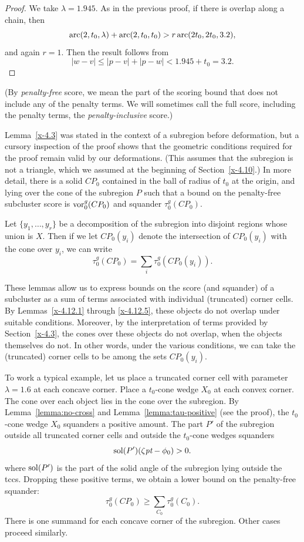 \begin{proof}
We take $\lambda=1.945$. As in the previous proof, if there is overlap
along a chain, then
    $$\operatorname{arc}(2,t_0,\lambda) +\operatorname{arc}(2,t_0,t_0) > r \operatorname{arc}(2t_0,2t_0,3.2),$$
and again $r=1$.  Then the result follows from
    $$|w-v|\le |p-v|+|p-w| < 1.945 + t_0 = 3.2.$$
\end{proof}

\begin{definition}
(By {\it penalty-free\/} score, we mean the part of the scoring
bound that does not include any of the penalty terms.  We will
sometimes call the full score, including the penalty terms, the
{\it penalty-inclusive\/} score.)
\end{definition}

Lemma~\ref{x-4.3} was stated in the context of a subregion before
deformation, but a cursory inspection of the proof shows that the
geometric conditions required for the proof remain valid by our
deformations. (This assumes that the subregion is not a triangle, which
we assumed at the beginning of Section~\ref{x-4.10}.) In more detail,
there is a solid $CP_0$ contained in the ball of radius of $t_0$ at the
origin, and lying over the cone of the subregion $P$ such that a bound
on the penalty-free subcluster score is $\operatorname{vor}^g_0(CP_0)$ and squander
$\tau^g_0(CP_0)$.


Let $\{y_1,\ldots,y_r\}$ be a decomposition of the subregion into
disjoint regions whose union is $X$. Then if we let $CP_0(y_i)$ denote
the intersection of $CP_0(y_i)$ with the cone over $y_i$, we can write
    $$\tau^g_0(CP_0) =\sum_i \tau^g_0(CP_0(y_i)).$$

These lemmas allow us to express bounds on the score (and squander) of a
subcluster as a sum of terms associated with individual (truncated)
corner cells. By Lemmas~\ref{x-4.12.1} through \ref{x-4.12.5}, these
objects do not overlap under suitable conditions. Moreover, by the
interpretation of terms provided by Section~\ref{x-4.3}, the cones over
these objects do not overlap, when the objects themselves do not. In
other words, under the various conditions, we can take the (truncated)
corner cells to be among the sets $CP_0(y_i)$.

To work a typical example, let us place a truncated corner cell with
parameter $\lambda=1.6$ at each concave corner.  Place a $t_0$-cone
wedge $X_0$ at each convex corner. The cone over each object lies in the
cone over the subregion. By Lemma~\ref{lemma:no-cross} and
Lemma~\ref{lemma:tau-positive} (see the proof), the $t_0$-cone wedge
$X_0$ squanders a positive amount.  The part $P'$ of the subregion
outside all truncated corner cells and outside the $t_0$-cone wedges
squanders
    $$\operatorname{sol}(P')(\zeta\hbox{\it pt}-\phi_0) > 0.$$
where $\operatorname{sol}(P')$ is the part of the solid angle of the subregion
lying outside the tccs. Dropping these positive terms, we obtain a
lower bound on the penalty-free squander:
    $$\tau^g_0(CP_0) \ge \sum_{C_0} \tau^g_0(C_0).$$
There is one summand for each concave corner of the subregion.
Other cases proceed similarly.


